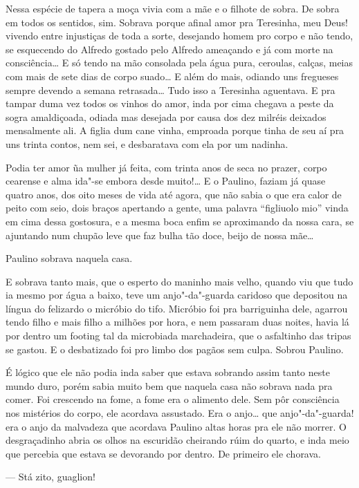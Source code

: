 \begin{linenumbers}
Nessa espécie de tapera a moça vivia com a mãe e o filhote de sobra. De
sobra em todos os sentidos, sim. Sobrava porque afinal amor pra
Teresinha, meu Deus! vivendo entre injustiças de toda a sorte, desejando
homem pro corpo e não tendo, se esquecendo do Alfredo gostado pelo
Alfredo ameaçando e já com morte na consciência\ldots{} E só tendo na mão
consolada pela água pura, ceroulas, calças, meias com mais de sete dias
de corpo suado\ldots{} E além do mais, odiando uns fregueses sempre devendo a
semana retrasada\ldots{} Tudo isso a Teresinha aguentava. E pra tampar duma
vez todos os vinhos do amor, inda por cima chegava a peste da sogra
amaldiçoada, odiada mas desejada por causa dos dez milréis deixados
mensalmente ali. A figlia dum cane vinha, emproada porque tinha de seu
aí pra uns trinta contos, nem sei, e desbaratava com ela por um
nadinha. 

Podia ter amor ũa mulher já feita, com trinta anos de seca no prazer,
corpo cearense e alma ida"-se embora desde muito!\ldots{} E o Paulino, faziam
já quase quatro anos, dos oito meses de vida até agora, que não sabia o
que era calor de peito com seio, dois braços apertando a gente, uma
palavra ``figliuolo mio'' vinda em cima dessa gostosura, e a mesma boca
enfim se aproximando da nossa cara, se ajuntando num chupão leve que faz
bulha tão doce, beijo de nossa mãe\ldots{}

Paulino sobrava naquela casa.

E sobrava tanto mais, que o esperto do maninho mais velho, quando viu
que tudo ia mesmo por água a baixo, teve um anjo"-da"-guarda caridoso que
depositou na língua do felizardo o micróbio do tifo. Micróbio foi pra
barriguinha dele, agarrou tendo filho e mais filho a milhões por hora, e
nem passaram duas noites, havia lá por dentro um footing tal da
microbiada marchadeira, que o asfaltinho das tripas se gastou. E o
desbatizado foi pro limbo dos pagãos sem culpa. Sobrou Paulino.

É lógico que ele não podia inda saber que estava sobrando assim tanto
neste mundo duro, porém sabia muito bem que naquela casa não sobrava
nada pra comer. Foi crescendo na fome, a fome era o alimento dele. Sem
pôr consciência nos mistérios do corpo, ele acordava assustado. Era o
anjo\ldots{} que anjo"-da"-guarda! era o anjo da malvadeza que acordava Paulino
altas horas pra ele não morrer. O desgraçadinho abria os olhos na
escuridão cheirando rúim do quarto, e inda meio que percebia que estava
se devorando por dentro. De primeiro ele chorava.

--- Stá zito, guaglion!


\end{linenumbers}
